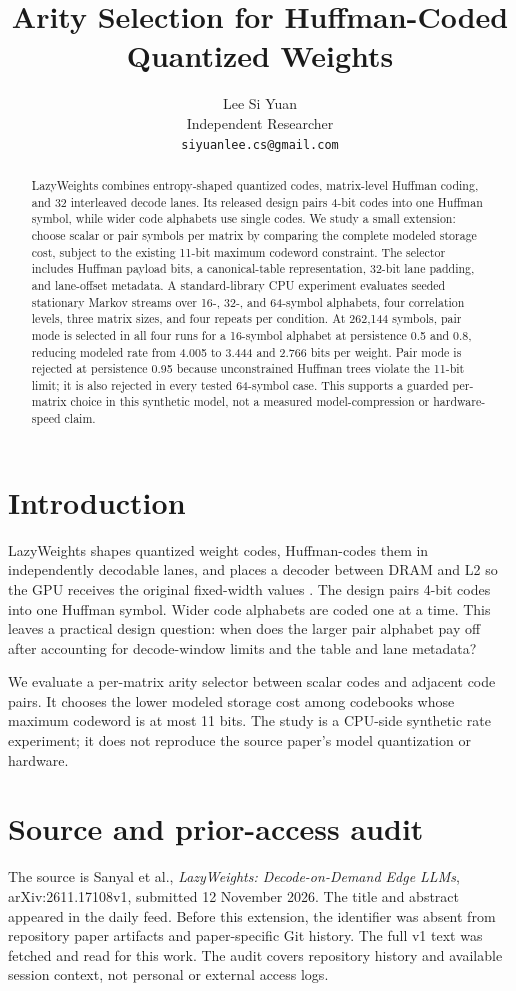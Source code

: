 \documentclass[11pt]{article}
\title{Arity Selection for Huffman-Coded Quantized Weights}
\author{Lee Si Yuan \\
  Independent Researcher \\
  \texttt{siyuanlee.cs@gmail.com}}
\begin{document}
\maketitle
\begin{abstract}
LazyWeights combines entropy-shaped quantized codes, matrix-level Huffman coding, and 32 interleaved decode lanes. Its released design pairs 4-bit codes into one Huffman symbol, while wider code alphabets use single codes. We study a small extension: choose scalar or pair symbols per matrix by comparing the complete modeled storage cost, subject to the existing 11-bit maximum codeword constraint. The selector includes Huffman payload bits, a canonical-table representation, 32-bit lane padding, and lane-offset metadata. A standard-library CPU experiment evaluates seeded stationary Markov streams over 16-, 32-, and 64-symbol alphabets, four correlation levels, three matrix sizes, and four repeats per condition. At 262,144 symbols, pair mode is selected in all four runs for a 16-symbol alphabet at persistence 0.5 and 0.8, reducing modeled rate from 4.005 to 3.444 and 2.766 bits per weight. Pair mode is rejected at persistence 0.95 because unconstrained Huffman trees violate the 11-bit limit; it is also rejected in every tested 64-symbol case. This supports a guarded per-matrix choice in this synthetic model, not a measured model-compression or hardware-speed claim.
\end{abstract}

\section{Introduction}
LazyWeights shapes quantized weight codes, Huffman-codes them in independently decodable lanes, and places a decoder between DRAM and L2 so the GPU receives the original fixed-width values \citep{sanyal2026lazyweights}. The design pairs 4-bit codes into one Huffman symbol. Wider code alphabets are coded one at a time. This leaves a practical design question: when does the larger pair alphabet pay off after accounting for decode-window limits and the table and lane metadata?

We evaluate a per-matrix arity selector between scalar codes and adjacent code pairs. It chooses the lower modeled storage cost among codebooks whose maximum codeword is at most 11 bits. The study is a CPU-side synthetic rate experiment; it does not reproduce the source paper's model quantization or hardware.

\section{Source and prior-access audit}
The source is Sanyal et al., \emph{LazyWeights: Decode-on-Demand Edge LLMs}, arXiv:2611.17108v1, submitted 12 November 2026. The title and abstract appeared in the daily feed. Before this extension, the identifier was absent from repository paper artifacts and paper-specific Git history. The full v1 text was fetched and read for this work. The audit covers repository history and available session context, not personal or external access logs.
\end{document}
